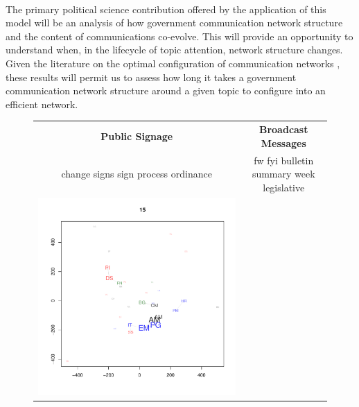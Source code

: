 ~\\
 The primary political science contribution offered by the application of this model will be an analysis of how government communication network structure and the content of communications co-evolve. This will provide an opportunity to understand when, in the lifecycle of topic attention, network structure changes. Given the literature on the optimal configuration of communication networks \cite{Mason2008,Mason2012}, these results will permit us to assess how long it takes  a government communication network structure around a given topic to configure into an efficient network.

\begin{figure}[t]
\begin{minipage}[b]{0.5\linewidth}
\centering
\begin{tabular}{cc}
{\bf Public Signage} &
{\bf Broadcast Messages}\\
{\small change signs sign process ordinance}  &
{\small fw fyi bulletin summary week legislative} \\
\includegraphics[scale=.29, trim=.4in .6in .4in .8in, clip=true]{latent_space_15} &

\end{tabular}
\end{minipage}
\end{figure}
